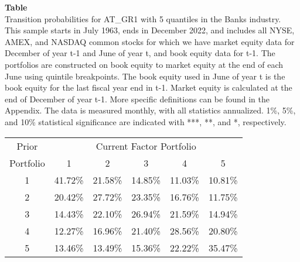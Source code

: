 \begin{table*}[ht!]
\raggedright
{}
\label{tab: transition_probs_AT_GR1_Banks_with_5_quantiles}
\textbf{Table \thetable} \\
Transition probabilities for AT_GR1 with 5 quantiles in the Banks industry. \\
\hspace*{1em}This sample starts in July 1963, ends in December 2022, and includes all NYSE, AMEX, and NASDAQ common stocks for which we have market equity data for December of year t-1 and June of year t, and book equity data for t-1. The portfolios are constructed on book equity to market equity at the end of each June using quintile breakpoints.  The book equity used in June of year t is the book equity for the last fiscal year end in t-1.  Market equity is calculated at the end of December of year t-1.  More specific definitions can be found in the Appendix.  The data is measured monthly, with all statistics annualized.  1\%, 5\%, and 10\% statistical significance are indicated with ***, **, and *, respectively. \\
\vspace{0.5em}
\centering
\begin{adjustbox}{max width=\textwidth}
\begin{tabular}{@{}cccccc@{}}
\toprule
Prior & \multicolumn{5}{c}{Current Factor Portfolio} \\
Portfolio & 1 & 2 & 3 & 4 & 5 \\
\midrule
1 & 41.72\% & 21.58\% & 14.85\% & 11.03\% & 10.81\% \\
2 & 20.42\% & 27.72\% & 23.35\% & 16.76\% & 11.75\% \\
3 & 14.43\% & 22.10\% & 26.94\% & 21.59\% & 14.94\% \\
4 & 12.27\% & 16.96\% & 21.40\% & 28.56\% & 20.80\% \\
5 & 13.46\% & 13.49\% & 15.36\% & 22.22\% & 35.47\% \\
\bottomrule
\end{tabular}
\end{adjustbox}
\end{table*}